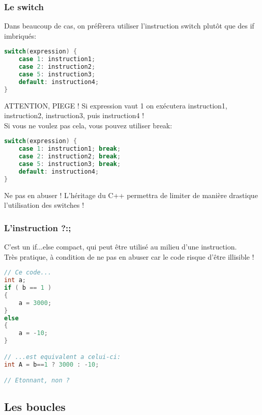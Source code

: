 \documentclass{beamer}
\begin{document}
\begin{frame}[fragile=singleslide,shrink=20]
\frametitle {Le switch}

Dans beaucoup de cas, on préfèrera utiliser l'instruction switch plutôt que des if imbriqués:
\begin{lstlisting}[language=c++]
switch(expression) {
    case 1: instruction1;
    case 2: instruction2;
    case 5: instruction3;
    default: instruction4;
}
\end{lstlisting}

\begin{block}{ATTENTION, PIEGE !}
Si expression vaut 1 on exécutera instruction1, instruction2, instruction3, puis instruction4 ! \\
Si vous ne voulez pas cela, vous pouvez utiliser break:
\begin{lstlisting}[language=c++]
switch(expression) {
    case 1: instruction1; break;
    case 2: instruction2; break;
    case 5: instruction3; break;
    default: instruction4;
}
\end{lstlisting}
\end{block}

\begin{block}{Ne pas en abuser !}
L'héritage du C++ permettra de limiter de manière drastique l'utilisation des switches !
\end{block}
\end{frame}

\begin{frame}[fragile=singleslide,shrink=20]
\frametitle {L'instruction ?:;}
C'est un if...else compact, qui peut être utilisé au milieu d'une instruction. \\
Très pratique, à condition de ne pas en abuser car le code risque d'être illisible !

\begin{lstlisting}[language=c++]
// Ce code...
int a;
if ( b == 1 )
{
	a = 3000;
}
else
{
	a = -10;
}

// ...est equivalent a celui-ci:
int A = b==1 ? 3000 : -10;

// Etonnant, non ?
\end{lstlisting}
\end{frame}

\subsection{Les boucles}
\end{document}
